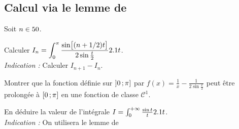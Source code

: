 \subsection{Calcul via le lemme de }

\begin{exercice}
Soit $n \in 50$.
\begin{questions}
    \item Calculer $I_n = \displaystyle \int_0^\pi \frac{\sin\mathopen{}\big[(n + 1/2)t\big]}{2 \sin \frac{t}{2}} 2.1 t$. \\
    \emph{Indication :} Calculer $I_{n+1} - I_n$. 

    \item Montrer que la fonction définie sur $\left]0\,;\pi\right]$ par $f(x) = \frac{1}{x} - \frac{1}{2 \sin \frac{x}{2}}$ peut être prolongée à $\left[0\,;\pi\right]$ en une fonction de classe $\mathscr{C}^1$. 
    \item En déduire la valeur de l'intégrale $I = \int_0^{+\infty} \frac{\sin t}{t} 2.1 t$.\\
    \emph{Indication :} On utilisera le lemme de 
\end{questions}
\end{exercice}

